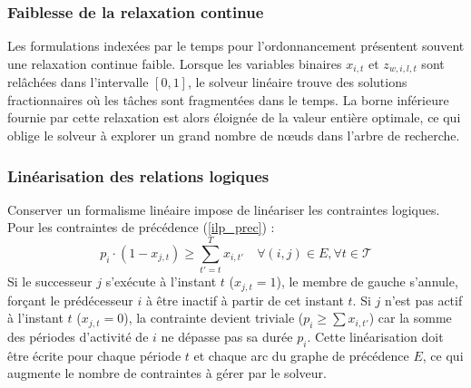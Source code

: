 \subsubsection{Faiblesse de la relaxation continue}
Les formulations indexées par le temps pour l'ordonnancement présentent souvent une relaxation continue faible. Lorsque les variables binaires $x_{i,t}$ et $z_{w,i,l,t}$ sont relâchées dans l'intervalle $[0, 1]$, le solveur linéaire trouve des solutions fractionnaires où les tâches sont fragmentées dans le temps. La borne inférieure fournie par cette relaxation est alors éloignée de la valeur entière optimale, ce qui oblige le solveur à explorer un grand nombre de nœuds dans l'arbre de recherche.

\subsubsection{Linéarisation des relations logiques}
Conserver un formalisme linéaire impose de linéariser les contraintes logiques. Pour les contraintes de précédence (\ref{ilp_prec}) :
\begin{equation*}
    p_i \cdot (1 - x_{j,t}) \geq \sum_{t'=t}^T x_{i,t'} \quad \forall (i,j) \in E, \forall t \in \mathcal{T}
\end{equation*}
Si le successeur $j$ s'exécute à l'instant $t$ ($x_{j,t}=1$), le membre de gauche s'annule, forçant le prédécesseur $i$ à être inactif à partir de cet instant $t$. Si $j$ n'est pas actif à l'instant $t$ ($x_{j,t}=0$), la contrainte devient triviale ($p_i \geq \sum x_{i,t'}$) car la somme des périodes d'activité de $i$ ne dépasse pas sa durée $p_i$. Cette linéarisation doit être écrite pour chaque période $t$ et chaque arc du graphe de précédence $E$, ce qui augmente le nombre de contraintes à gérer par le solveur.
